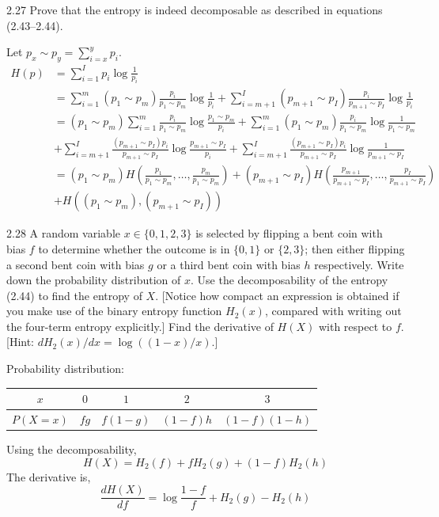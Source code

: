 \documentclass[12pt, a4paper]{article}
\begin{document}
\begin{prob}{2.27}
    Prove that the entropy is indeed decomposable as described in equations (2.43--2.44).
\end{prob}
\begin{sol}
    Let $p_x \sim p_y = \sum_{i=x}^{y} p_i$.
    \begin{align*}
        H(p) &= \sum_{i=1}^{I} p_i \log \frac{1}{p_i} \\
        &= \sum_{i=1}^{m} (p_1 \sim p_m) \frac{p_i}{p_1 \sim p_m} \log \frac{1}{p_i} + \sum_{i=m+1}^{I} (p_{m+1} \sim p_I) \frac{p_i}{p_{m+1} \sim p_I} \log \frac{1}{p_i} \\
        &= (p_1 \sim p_m) \sum_{i=1}^{m} \frac{p_i}{p_1 \sim p_m} \log \frac{p_1 \sim p_m}{p_i} + \sum_{i=1}^{m} (p_1 \sim p_m) \frac{p_i}{p_1 \sim p_m} \log \frac{1}{p_1 \sim p_m} \\
        &+ \sum_{i=m+1}^{I} \frac{(p_{m+1} \sim p_I)p_i}{p_{m+1} \sim p_I} \log \frac{p_{m+1} \sim p_I}{p_i} + \sum_{i=m+1}^{I}  \frac{(p_{m+1} \sim p_I)p_i}{p_{m+1} \sim p_I} \log \frac{1}{p_{m+1} \sim p_I} \\
        &= (p_1 \sim p_m) H(\frac{p_1}{p_1 \sim p_m}, \dots , \frac{p_m}{p_1 \sim p_m}) + (p_{m+1} \sim p_I) H(\frac{p_{m+1}}{p_{m+1} \sim p_I}, \dots , \frac{p_I}{p_{m+1} \sim p_I}) \\
        &+ H((p_1 \sim p_m), (p_{m+1} \sim p_I))
    \end{align*}
\end{sol}
\bigskip


\begin{prob}{2.28}
A random variable $x \in \{0, 1, 2, 3\}$ is selected by flipping a bent coin with bias $f$ to determine whether the outcome is in $\{0, 1\}$ or $\{2, 3\}$; then either flipping a second bent coin with bias $g$ or a third bent coin with bias $h$ respectively. Write down the probability distribution of $x$. Use the decomposability of the entropy (2.44) to find the entropy of $X$. [Notice how compact an expression is obtained if you make use of the binary entropy function $H_2(x)$, compared with writing out the four-term entropy explicitly.] Find the derivative of $H(X)$ with respect to $f$. [Hint: $dH_2(x)/dx = \log((1-x)/x)$.]
\end{prob}
\begin{sol}
    Probability distribution: \\[1em]
    \begin{tabular}{c|c|c|c|c}
        $x$ & $0$ & $1$ & $2$ & $3$ \\
        \hline
        $P(X = x)$ & $fg$ & $f(1-g)$ & $(1-f)h$ & $(1-f)(1-h)$ \\
    \end{tabular}
    Using the decomposability,
    $$H(X) = H_2(f) + fH_2(g) + (1-f)H_2(h)$$
    The derivative is,
    $$\frac{dH(X)}{df} = \log \frac{1-f}{f} + H_2(g) - H_2(h)$$
\end{sol}
\bigskip
\end{document}
